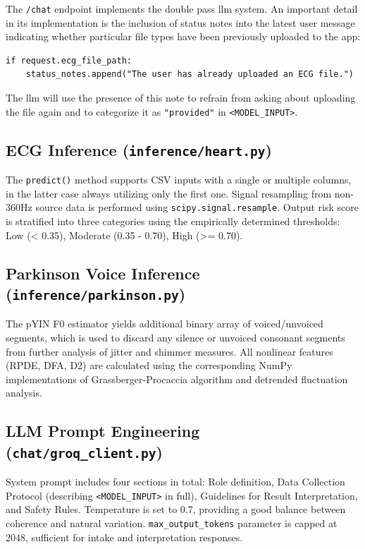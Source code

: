 The \texttt{/chat} endpoint implements the double pass \ac{llm} system. An important detail in its implementation is the inclusion of status notes into the latest user message indicating whether particular file types have been previously uploaded to the app:

\begin{verbatim}
if request.ecg_file_path:
    status_notes.append("The user has already uploaded an ECG file.")
\end{verbatim}

The \ac{llm} will use the presence of this note to refrain from asking about uploading the file again and to categorize it as \texttt{"provided"} in \texttt{<MODEL\_INPUT>}.

\subsection{ECG Inference (\texttt{inference/heart.py})}

The \texttt{predict()} method supports CSV inputs with a single or multiple columns, in the latter case always utilizing only the first one. Signal resampling from non-360Hz source data is performed using \texttt{scipy.signal.resample}. Output risk score is stratified into three categories using the empirically determined thresholds: Low (< 0.35), Moderate (0.35 - 0.70), High (>= 0.70).

\subsection{Parkinson Voice Inference (\texttt{inference/parkinson.py})}

The pYIN F0 estimator yields additional binary array of voiced/unvoiced segments, which is used to discard any silence or unvoiced consonant segments from further analysis of jitter and shimmer measures. All nonlinear features (RPDE, DFA, D2) are calculated using the corresponding NumPy implementations of Grassberger-Procaccia algorithm and detrended fluctuation analysis.

\subsection{LLM Prompt Engineering (\texttt{chat/groq\_client.py})}

System prompt includes four sections in total: Role definition, Data Collection Protocol (describing \texttt{<MODEL\_INPUT>} in full), Guidelines for Result Interpretation, and Safety Rules. Temperature is set to 0.7, providing a good balance between coherence and natural variation. \texttt{max\_output\_tokens} parameter is capped at 2048, sufficient for intake and interpretation responses.


